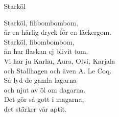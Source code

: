 \begin{song}{Starköl}
	
	
	
	Starköl, filibombombom,\\
	är en härlig dryck för en läckergom.\\
	Starköl, fibombombom, \\
	än har flaskan ej blivit tom.\\
	Vi har ju Karhu, Aura, Olvi, Karjala\\
	och Stallhagen och även A. Le Coq.\\
	Så lyd de gamla lagarna\\
	och njut av öl om dagarna.\\
	Det gör så gott i magarna,\\
	det stärker vår aptit.

\end{song}
